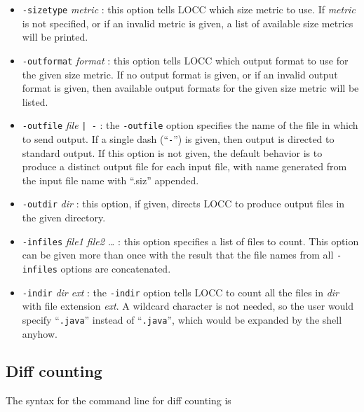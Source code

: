 \begin{itemize}

\item {\tt -sizetype} {\em metric} : this option tells LOCC which size
      metric to use.  If {\em metric} is not specified, or if an
      invalid metric is given, a list of
      available size metrics will be printed.

\item {\tt -outformat} {\em format} : this option tells LOCC which output
      format to use for the given size metric.  If no output format is 
      given, or if an invalid output format is given, then available
      output formats for the given size metric will be listed.

\item {\tt -outfile} {\em file} {\tt | -} : the {\tt -outfile} option specifies
      the name of the file in which to send output.  If a single dash
      (``{\tt -}'') is given, then output is directed to standard output.
      If this option is not given, the default behavior is to produce
      a distinct output file for each input file, with name generated
      from the input file name with ``.siz'' appended.
        
\item {\tt -outdir} {\em dir} : this option, if given, directs LOCC to
      produce output files in the given directory.

\item {\tt -infiles} {\em file1 file2 \ldots} : this option specifies a list
      of files to count.  This option can be given more than once with the
      result that the file names from all {\tt -infiles} options are
      concatenated. 

\item {\tt -indir} {\em dir ext} : the {\tt -indir} option tells LOCC to
      count all the files in {\em dir} with file extension {\em ext}.
      A wildcard character is not needed, so the user would specify
      ``{\tt .java}'' instead of ``{\tt *.java}'', which would be
      expanded by the shell anyhow.

\end{itemize}

\subsection{Diff counting}

The syntax for the command line for diff counting is 

